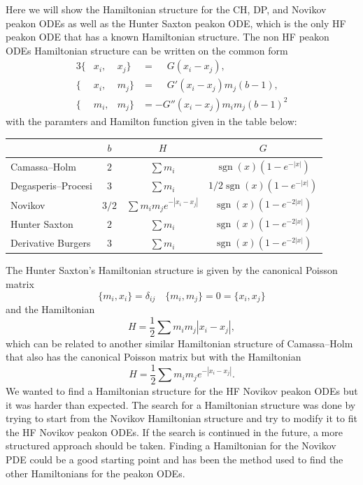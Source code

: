 \documentclass[english,master]{liumaiex}
\theoremstyle{plain}
\theoremstyle{definition}
\DeclareMathOperator{\sgn}{sgn}
\begin{document}
Here we will show the Hamiltonian structure for the CH, DP, and Novikov peakon ODEs as well as the Hunter Saxton peakon ODE, which is the only HF peakon ODE that has a known Hamiltonian structure. The non HF peakon ODEs Hamiltonian structure can be written on the common form
\begin{alignat}{3}
	\{&x_i, &x_j\} &= \phantom{-}G(x_i - x_j), \\
	\{&x_i, &m_j\} &= \phantom{-}G'(x_i - x_j)m_j (b - 1), \\
	\{&m_i, &m_j\} &=           -G''(x_i - x_j) m_i m_j (b - 1)^2
\end{alignat}
%
with the paramters and Hamilton function given in the table below:
\begin{center}
  \begin{tabular}{l|c|c|c}
    & $b$ & $H$ & $G$ \\
    \hline
    Camassa--Holm
	& $2$ & $\sum m_i$ & $\sgn(x)(1 - e^{-|x|})$ \\
    \hline
    Degasperis--Procesi
	& $3$ & $\sum m_i$ & $1/2 \sgn(x)(1 - e^{-|x|})$ \\
    \hline
    Novikov
	& $3/2$ & $\sum m_i m_j e^{-|x_i - x_j|}$ & $\sgn(x)(1 - e^{-2|x|})$ \\
    \hline
	Hunter Saxton
	& $2$ & $\sum m_i $ & $\sgn(x)(1 - e^{-2|x|})$ \\
    \hline
    Derivative Burgers
	& $3$ & $\sum m_i $ & $\sgn(x)(1 - e^{-2|x|})$ \\
  \end{tabular}
\end{center}
%
The Hunter Saxton's Hamiltonian structure is given by the canonical Poisson matrix
\begin{equation}
	\{m_i, x_i\} = \delta_{ij} \quad \{m_i, m_j\} = 0 = \{x_i, x_j\}
\end{equation}
and the Hamiltonian
\begin{equation}
	H = \frac{1}{2} \sum m_i m_j |x_i - x_j|,
\end{equation}
which can be related to another similar Hamiltonian structure of Camassa--Holm that also has the canonical Poisson matrix but with the Hamiltonian 
\begin{equation}
	H = \frac{1}{2} \sum m_i m_j e^{-|x_i - x_j|}.
\end{equation}
%
We wanted to find a Hamiltonian structure for the HF Novikov peakon ODEs but it was harder than expected. The search for a Hamiltonian structure was done by trying to start from the Novikov Hamiltonian structure and try to modify it to fit the HF Novikov peakon ODEs. If the search is continued in the future, a more structured approach should be taken. Finding a Hamiltonian for the Novikov PDE could be a good starting point and has been the method used to find the other Hamiltonians for the peakon ODEs.
\end{document}
